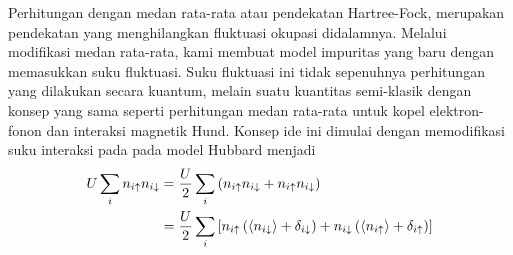 Perhitungan dengan medan rata-rata atau pendekatan Hartree-Fock, merupakan pendekatan yang menghilangkan fluktuasi okupasi didalamnya. Melalui modifikasi medan rata-rata, kami membuat model impuritas yang baru dengan memasukkan suku fluktuasi. Suku fluktuasi ini tidak sepenuhnya perhitungan yang dilakukan secara kuantum, melain suatu kuantitas semi-klasik dengan konsep yang sama seperti perhitungan medan rata-rata untuk kopel elektron-fonon\cite{el-ph} dan interaksi magnetik Hund\cite{hund}. Konsep ide ini dimulai dengan memodifikasi suku interaksi pada pada model Hubbard menjadi
\begin{align}
U \sum_i n_{i\uparrow} n _{i\downarrow} &= \frac{U}{2} \sum_i \left( n_{i\uparrow} n _{i\downarrow} + n_{i\uparrow} n _{i\downarrow} \right)\notag\\
&= \frac{U}{2} \sum_i \left[ n_{i\uparrow} \left(\left< n _{i\downarrow} \right> + \delta_{i\downarrow} \right) + n _{i\downarrow} \left( \left< n_{i\uparrow} \right> + \delta_{i\uparrow} \right) \right]
\end{align}

